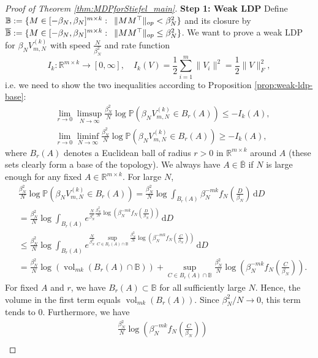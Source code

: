 \documentclass[11pt,a4paper,twoside]{article}
\newcommand{\R}{\mathbb R}
\newcommand{\dint}{\,\mathrm{d}}
\DeclareMathOperator{\vol}{vol}
\theoremstyle{definition}
\begin{document}
\begin{proof}[Proof of Theorem \ref{thm:MDPforStiefel_main}]
		\noindent\textbf{Step 1: Weak LDP} Define $\mathbb{B}:= \{M\in [-\beta_N,\beta_N]^{m\times k}:\enskip \|MM^\top\|_{op}< \beta_N^2\}$ and its closure by $\overline{\mathbb{B}}:= \{M\in [-\beta_N, \beta_N]^{m\times k}:\enskip \|MM^\top\|_{op}\le \beta_N^2\}$. We want to prove a weak LDP for $\beta_N V_{m,N}^{(k)}$ with speed $\frac{N}{\beta_N^2}$ and rate function 
		$$
		I_k:\R^{m\times k}\to [0,\infty], \quad I_k(V) = \frac{1}{2}\sum_{i=1}^m \|V_i\|^2 = \frac{1}{2}\|V\|_F^2,
		$$ 
		i.e. we need to show the two inequalities according to Proposition \ref{prop:weak-ldp-base}:
		\begin{align}
			& \lim _{r \rightarrow 0} \limsup _{N \rightarrow \infty} \frac{\beta_N^2}{N} \log \mathbb{P}\left(\beta_N V_{m,N}^{(k)} \in B_r(A)\right) \leq -I_k(A),\label{upperboundwaek} \\
			& \lim _{r \rightarrow 0} \liminf _{N \rightarrow \infty} \frac{\beta_N^2}{N} \log \mathbb{P}\left(\beta_N V_{m,N}^{(k)} \in B_r(A)\right) \geq -I_k(A),\label{lowerboundweak}
		\end{align}
		where $B_r(A)$ denotes a Euclidean ball of radius $r>0$ in $\R^{m\times k}$ around $A$ (these sets clearly form a base of the topology). We always have $A\in \overline{\mathbb{B}}$ if $N$ is large enough for any fixed $A\in\R^{m\times k}$. For large $N$,
		\begin{align*}
			&\frac{\beta_N^2}{N} \log \mathbb{P}\left(\beta_N V_{m,N}^{(k)} \in B_r(A)\right) = \frac{\beta_N^2}{N} \log \int_{B_r(A)}\beta_N^{-mk}f_N\left(\frac{D}{\beta_N}\right) \dint D\\
			&= \frac{\beta_N^2}{N} \log \int_{B_r(A)} e^{\frac{N}{\beta_N^2}\frac{\beta_N^2}{N}\log\left(\beta_N^{-mk}f_N\left(\frac{D}{\beta_N}\right)\right)} \dint D \\
	  &\le \frac{\beta_N^2}{N} \log \int_{B_r(A)} e^{\frac{N}{\beta_N^2} \sup_{C\in B_r(A)\cap\mathbb{B}}\frac{\beta_N^2}{N}\log\left(\beta_N^{-mk}f_N\left(\frac{C}{\beta_N}\right)\right)} \dint D\\
			&= \frac{\beta_N^2}{N}\log\left(\vol_{mk}(B_r(A)\cap \mathbb{B})\right) + \sup_{C\in B_r(A)\cap\mathbb{B}}\frac{\beta_N^2}{N}\log\left(\beta_N^{-mk}f_N\left(\frac{C}{\beta_N}\right)\right).
		\end{align*}
		For fixed $A$ and $r$, we have $B_r(A)\subset\mathbb{B}$ for all sufficiently large $N$. Hence, the volume in the first term equals $\vol_{mk}(B_r(A))$. Since $\beta_N^2/N\to0$, this term tends to $0$. Furthermore, we have
		\begin{align*}
			&\frac{\beta_N^2}{N}\log\left(\beta_N^{-mk}f_N\left(\frac{C}{\beta_N}\right)\right)\\

\end{align*}
\end{proof}
\end{document}
